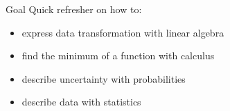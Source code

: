 
\begin{frame}{Goal}
  Quick refresher on how to:

  \begin{itemize}
  \item express data transformation with linear algebra
  \item find the minimum of a function with calculus
  \item describe uncertainty with probabilities
  \item describe data with statistics
  \end{itemize}
\end{frame}
